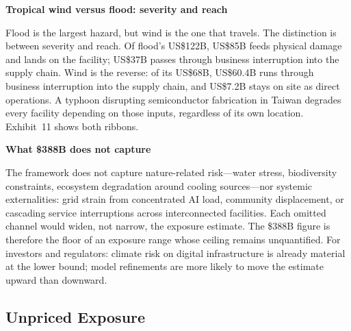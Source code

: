 \begin{twocolbody}

{\color{SEGreen}\textbf{Tropical wind versus flood: severity and reach}}

\vspace{1mm}

\noindent Flood is the largest hazard, but wind is the one that travels. The distinction is between severity and reach. Of flood's US\$122B, US\$85B feeds physical damage and lands on the facility; US\$37B passes through business interruption into the supply chain. Wind is the reverse: of its US\$68B, US\$60.4B runs through business interruption into the supply chain, and US\$7.2B stays on site as direct operations. A typhoon disrupting semiconductor fabrication in Taiwan degrades every facility depending on those inputs, regardless of its own location. Exhibit~11 shows both ribbons.

\vspace{3mm}

{\color{SEGreen}\textbf{What \$388B does not capture}}

\vspace{1mm}

\noindent The framework does not capture nature-related risk---water stress, biodiversity constraints, ecosystem degradation around cooling sources---nor systemic externalities: grid strain from concentrated AI load, community displacement, or cascading service interruptions across interconnected facilities. Each omitted channel would widen, not narrow, the exposure estimate. The \$388B figure is therefore the floor of an exposure range whose ceiling remains unquantified. For investors and regulators: climate risk on digital infrastructure is already material at the lower bound; model refinements are more likely to move the estimate upward than downward.

\end{twocolbody}


\clearpage\thispagestyle{chapterstart}

{\color{SEGreen}\subsection*{Unpriced Exposure}}
\greensep

